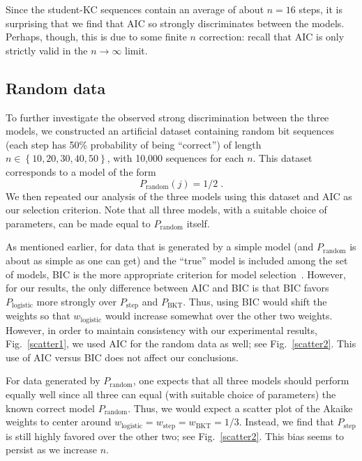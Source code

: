 \documentclass{edm_template}
\begin{document}
Since the student-KC sequences contain an average of about $n=16$ 
steps, it is surprising that we find that AIC so strongly
discriminates between the models.  Perhaps, though,  this is due to
some finite $n$ correction:  recall that AIC is only 
strictly valid in the $n\to\infty$ limit.

\subsection{Random data}


To further investigate the observed strong discrimination
between the three models, we constructed an
artificial dataset containing random bit sequences (each
step has 50\% probability of being ``correct'') of length 
$n\in\left\{10,20,30,40,50\right\}$, with 10,000 sequences for 
each $n$.
This dataset corresponds to a model of the form
%
\begin{equation}
        P_\mathrm{random}(j)=1/2 \; .
\end{equation}
%
We then repeated our analysis of the three models using this dataset
and AIC as our selection criterion.  Note that all three models,
with a suitable choice of parameters, can be made equal to 
$P_\mathrm{random}$ itself.


As mentioned earlier, for data that is generated by a simple 
model (and $P_\mathrm{random}$ is about as
simple as one can get) and the ``true'' model is included among
the set of models, BIC is the more appropriate criterion
for model selection~\cite[Sections~6.3 \& 6.4]{burnham_model_2002}.
However, for our results, the only difference between AIC and BIC 
is that BIC favors $P_\mathrm{logistic}$ more strongly over 
$P_\mathrm{step}$ and $P_\mathrm{BKT}$.  Thus, using BIC would shift 
the weights so that $w_\mathrm{logistic}$ would increase somewhat over 
the other two weights.  However, in order to maintain consistency with
our experimental results, Fig.~\ref{scatter1}, we used AIC for the random data as well;
see Fig.~\ref{scatter2}.  This use of AIC versus BIC does not 
affect our conclusions.

For data generated by $P_\mathrm{random}$,
one expects that all three models should perform equally
well since all three can equal (with suitable choice of parameters)
the known correct model $P_\mathrm{random}$.  Thus, we would expect
a scatter plot of the Akaike weights to center around
$w_\mathrm{logistic}=w_\mathrm{step}=w_\mathrm{BKT}=1/3$.  Instead, we
find that $P_\mathrm{step}$ is still highly favored over the other two; see
Fig.~\ref{scatter2}. This bias seems to persist as we increase $n$.
\end{document}
